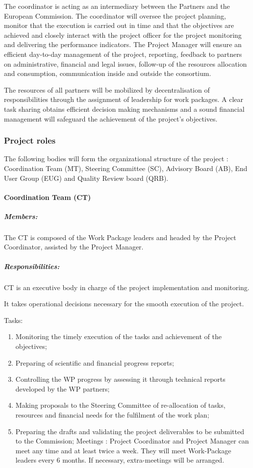 The coordinator is acting as an intermediary between the Partners and
the European Commission. The coordinator will oversee the project
planning, monitor that the execution is carried out in time and that
the objectives are achieved and closely interact with the project
officer for the project monitoring and delivering the performance
indicators.  The Project Manager will ensure an efficient day-to-day
management of the project, reporting, feedback to partners on
administrative, financial and legal issues, follow-up of the resources
allocation and consumption, communication inside and outside the
consortium.

The resources of all partners will be mobilized by decentralisation of
responsibilities through the assignment of leadership for work
packages. A clear task sharing obtains efficient decision making
mechanisms and a sound financial management will safeguard the
achievement of the project’s objectives.

\subsubsection{Project roles}

The following bodies will form the organizational structure of the
\TheProject project : Coordination Team (MT), Steering Committee (SC),
Advisory Board (AB), End User Group (EUG) and Quality Review board
(QRB).


\paragraph{Coordination Team (CT)} 
\subparagraph{Members:} The CT is composed of the Work Package leaders
and headed by the Project Coordinator, assisted by the Project
Manager.

\subparagraph{Responsibilities:} CT is an executive body in charge of
the project implementation and monitoring.

It takes operational decisions necessary for the smooth execution of
the project.

Tasks:
\begin{enumerate} 
\item Monitoring the timely execution of the tasks and achievement of
  the objectives;
\item Preparing of scientific and financial progress reports;
\item Controlling the WP progress by assessing it through technical
  reports developed by the WP partners;
\item Making proposals to the Steering Committee of re-allocation of
  tasks, resources and financial needs for the fulfilment of the work
  plan;
\item Preparing the drafts and validating the project deliverables to
  be submitted to the Commission; Meetings : Project Coordinator and
  Project Manager can meet any time and at least twice a week. They
  will meet Work-Package leaders every 6 months. If necessary,
  extra-meetings will be arranged.
\end{enumerate} 

